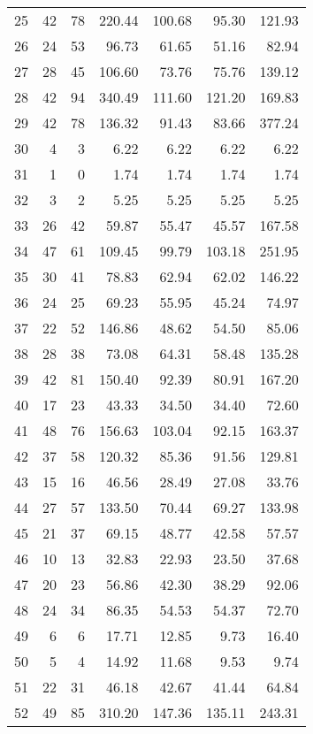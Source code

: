 \begin{longtable}{rrrrrrr}
   25 &  42 &  78 & 220.44 & 100.68 & 95.30 & 121.93 \\ 
   26 &  24 &  53 & 96.73 & 61.65 & 51.16 & 82.94 \\ 
   27 &  28 &  45 & 106.60 & 73.76 & 75.76 & 139.12 \\ 
   28 &  42 &  94 & 340.49 & 111.60 & 121.20 & 169.83 \\ 
   29 &  42 &  78 & 136.32 & 91.43 & 83.66 & 377.24 \\ 
   30 &   4 &   3 & 6.22 & 6.22 & 6.22 & 6.22 \\ 
   31 &   1 &   0 & 1.74 & 1.74 & 1.74 & 1.74 \\ 
   32 &   3 &   2 & 5.25 & 5.25 & 5.25 & 5.25 \\ 
   33 &  26 &  42 & 59.87 & 55.47 & 45.57 & 167.58 \\ 
   34 &  47 &  61 & 109.45 & 99.79 & 103.18 & 251.95 \\ 
   35 &  30 &  41 & 78.83 & 62.94 & 62.02 & 146.22 \\ 
   36 &  24 &  25 & 69.23 & 55.95 & 45.24 & 74.97 \\ 
   37 &  22 &  52 & 146.86 & 48.62 & 54.50 & 85.06 \\ 
   38 &  28 &  38 & 73.08 & 64.31 & 58.48 & 135.28 \\ 
   39 &  42 &  81 & 150.40 & 92.39 & 80.91 & 167.20 \\ 
   40 &  17 &  23 & 43.33 & 34.50 & 34.40 & 72.60 \\ 
   41 &  48 &  76 & 156.63 & 103.04 & 92.15 & 163.37 \\ 
   42 &  37 &  58 & 120.32 & 85.36 & 91.56 & 129.81 \\ 
   43 &  15 &  16 & 46.56 & 28.49 & 27.08 & 33.76 \\ 
   44 &  27 &  57 & 133.50 & 70.44 & 69.27 & 133.98 \\ 
   45 &  21 &  37 & 69.15 & 48.77 & 42.58 & 57.57 \\ 
   46 &  10 &  13 & 32.83 & 22.93 & 23.50 & 37.68 \\ 
   47 &  20 &  23 & 56.86 & 42.30 & 38.29 & 92.06 \\ 
   48 &  24 &  34 & 86.35 & 54.53 & 54.37 & 72.70 \\ 
   49 &   6 &   6 & 17.71 & 12.85 & 9.73 & 16.40 \\ 
   50 &   5 &   4 & 14.92 & 11.68 & 9.53 & 9.74 \\ 
   51 &  22 &  31 & 46.18 & 42.67 & 41.44 & 64.84 \\ 
   52 &  49 &  85 & 310.20 & 147.36 & 135.11 & 243.31 \\ 

\end{longtable}
